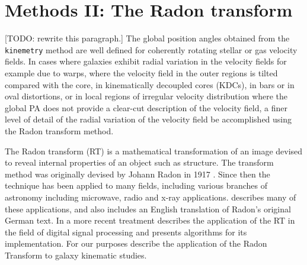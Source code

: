 \section{Methods II: The Radon transform}
\label{sec:Radon}
[TODO: rewrite this paragraph.] The global position angles obtained from the \texttt{kinemetry} method are well defined for coherently rotating stellar or gas velocity fields. In cases where galaxies exhibit radial variation in the velocity fields for example due to warps, where the velocity field in the outer regions is tilted compared with the core, in kinematically decoupled cores (KDCs), in bars or in oval distortions, or in local regions of irregular velocity distribution where the global PA does not provide a clear-cut description of the velocity field, a finer level of detail of the radial variation of the velocity field be accomplished using the Radon transform method. 

The Radon transform (RT) is a mathematical transformation of an image devised to reveal internal properties of an object such as structure. The transform method was originally devised by Johann Radon in 1917 \citep{radon1917determination}. Since then the technique has been applied to many fields, including various branches of astronomy including microwave, radio and x-ray applications. \citet{deans2007radon} describes many of these applications, and also includes an English translation of Radon's original German text. In a more recent treatment  \citet{7910dc8d5b654c90ac4bc94c67d06f01} describes the application of the RT in the field of digital signal processing and presents algorithms for its implementation. For our purposes \cite{2018MNRAS.480.2217S} describe the application of the Radon Transform to galaxy kinematic studies.  

